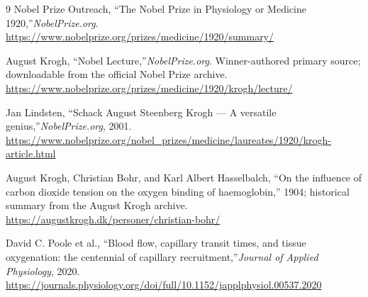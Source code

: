 \begin{thebibliography}{9}
Nobel Prize Outreach, ``The Nobel Prize in Physiology or Medicine 1920,''\emph{NobelPrize.org}.\\
\url{https://www.nobelprize.org/prizes/medicine/1920/summary/}

August Krogh, ``Nobel Lecture,''\emph{NobelPrize.org}. Winner-authored primary source; downloadable from the official Nobel Prize archive.\\
\url{https://www.nobelprize.org/prizes/medicine/1920/krogh/lecture/}

Jan Lindsten, ``Schack August Steenberg Krogh --- A versatile genius,''\emph{NobelPrize.org}, 2001.\\
\url{https://www.nobelprize.org/nobel_prizes/medicine/laureates/1920/krogh-article.html}

August Krogh, Christian Bohr, and Karl Albert Hasselbalch, ``On the influence of carbon dioxide tension on the oxygen binding of haemoglobin,'' 1904; historical summary from the August Krogh archive.\\
\url{https://augustkrogh.dk/personer/christian-bohr/}

David C. Poole et al., ``Blood flow, capillary transit times, and tissue oxygenation: the centennial of capillary recruitment,''\emph{Journal of Applied Physiology}, 2020.\\
\url{https://journals.physiology.org/doi/full/10.1152/japplphysiol.00537.2020}
\end{thebibliography}

